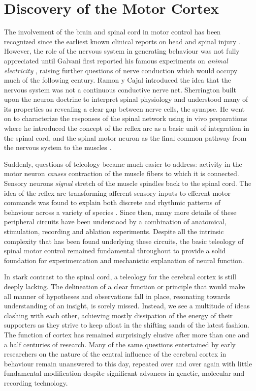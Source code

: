 \section{Discovery of the Motor Cortex}

The involvement of the brain and spinal cord in motor control has been recognized since the earliest known clinical reports on head and spinal injury \cite{Breasted1930,VanMiddendorp2010}. However, the role of the nervous system in generating behaviour was not fully appreciated until Galvani first reported his famous experiments on \textit{animal electricity} \cite{Galvani1791}, raising further questions of nerve conduction which would occupy much of the following century. Ramon y Cajal introduced the idea that the nervous system was not a continuous conductive nerve net. Sherrington built upon the neuron doctrine to interpret spinal physiology and understood many of its properties as revealing a clear gap between nerve cells, the synapse. He went on to characterize the responses of the spinal network using in vivo preparations where he introduced the concept of the reflex arc as a basic unit of integration in the spinal cord, and the spinal motor neuron as the final common pathway from the nervous system to the muscles \cite{Sherrington1906}.

Suddenly, questions of teleology became much easier to address: activity in the motor neuron \emph{causes} contraction of the muscle fibers to which it is connected. Sensory neurons \emph{signal} stretch of the muscle spindles back to the spinal cord. The idea of the reflex arc transforming afferent sensory inputs to efferent motor commands was found to explain both discrete and rhythmic patterns of behaviour across a variety of species \cite{Sherrington1892}. Since then, many more details of these peripheral circuits have been understood by a combination of anatomical, stimulation, recording and ablation experiments. Despite all the intrinsic complexity that has been found underlying these circuits, the basic teleology of spinal motor control remained fundamental throughout to provide a solid foundation for experimentation and mechanistic explanation of neural function.

In stark contrast to the spinal cord, a teleology for the cerebral cortex is still deeply lacking. The delineation of a clear function or principle that would make all manner of hypotheses and observations fall in place, resonating towards understanding of an insight, is sorely missed. Instead, we see a multitude of ideas clashing with each other, achieving mostly dissipation of the energy of their supporters as they strive to keep afloat in the shifting sands of the latest fashion. The function of cortex has remained surprisingly elusive after more than one and a half centuries of research. Many of the same questions entertained by early researchers on the nature of the central influence of the cerebral cortex in behaviour remain unanswered to this day, repeated over and over again with little fundamental modification despite significant advances in genetic, molecular and recording technology.

